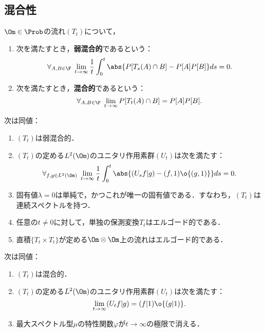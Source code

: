 \documentclass[uplatex,dvipdfmx]{jsreport}
\begin{document}
\subsection{混合性}

\begin{definition}
    $\Om\in\Prob$の流れ$(T_t)$について，
    \begin{enumerate}
        \item 次を満たすとき，\textbf{弱混合的}であるという：
        \[\forall_{A,B\in\F}\;\lim_{t\to\infty}\frac{1}{t}\int^t_0\abs{P[T_s(A)\cap B]-P[A]P[B]}ds=0.\]
        \item 次を満たすとき，\textbf{混合的}であるという：
        \[\forall_{A,B\in\F}\;\lim_{t\to\infty}P[T_t(A)\cap B]=P[A]P[B].\]
    \end{enumerate}
\end{definition}

\begin{proposition}[弱混合性の特徴付け]
    次は同値：
    \begin{enumerate}
        \item $(T_t)$は弱混合的．
        \item $(T_t)$の定める$L^2(\Om)$のユニタリ作用素群$(U_t)$は次を満たす：
        \[\forall_{f,g\in L^2(\Om)}\;\lim_{t\to\infty}\frac{1}{t}\int^t_0\abs{(U_sf|g)-(f,1)\o{(g,1)}}ds=0.\]
        \item 固有値$\lambda=0$は単純で，かつこれが唯一の固有値である．すなわち，$(T_t)$は連続スペクトルを持つ．
        \item 任意の$t\ne0$に対して，単独の保測変換$T_t$はエルゴード的である．
        \item 直積$\{T_t\times T_t\}$が定める$\Om\otimes\Om$上の流れはエルゴード的である．
    \end{enumerate}
\end{proposition}

\begin{proposition}[混合性の特徴付け]
    次は同値：
    \begin{enumerate}
        \item $(T_t)$は混合的．
        \item $(T_t)$の定める$L^2(\Om)$のユニタリ作用素群$(U_t)$は次を満たす：
        \[\lim_{t\to\infty}(U_tf|g)=(f|1)\o{(g|1)}.\]
        \item 最大スペクトル型$\mu$の特性関数$\varphi$が$t\to\infty$の極限で消える．
    \end{enumerate}
\end{proposition}
\end{document}
